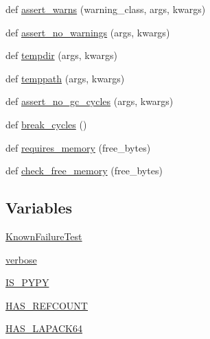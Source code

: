 \begin{DoxyCompactItemize}
def \hyperlink{namespacenumpy_1_1testing_1_1__private_1_1utils_a64b071c82e9ecb8aad0515f7ba217e9d}{assert\+\_\+warns} (warning\+\_\+class, args, kwargs)
\item 
def \hyperlink{namespacenumpy_1_1testing_1_1__private_1_1utils_a3f23e39a989fc996a88d58fa2ce03134}{assert\+\_\+no\+\_\+warnings} (args, kwargs)
\item 
def \hyperlink{namespacenumpy_1_1testing_1_1__private_1_1utils_a05901223fea3a962d09904ced2cbbabd}{tempdir} (args, kwargs)
\item 
def \hyperlink{namespacenumpy_1_1testing_1_1__private_1_1utils_ab53b48d1f4f2593e39d1fe9be00b3cc8}{temppath} (args, kwargs)
\item 
def \hyperlink{namespacenumpy_1_1testing_1_1__private_1_1utils_aeb0834f11062ae32be7e366a8601278f}{assert\+\_\+no\+\_\+gc\+\_\+cycles} (args, kwargs)
\item 
def \hyperlink{namespacenumpy_1_1testing_1_1__private_1_1utils_acffb1a5389e1d7e84e257af6b81590ff}{break\+\_\+cycles} ()
\item 
def \hyperlink{namespacenumpy_1_1testing_1_1__private_1_1utils_a7893225a239144d72d56ad9a90a77aeb}{requires\+\_\+memory} (free\+\_\+bytes)
\item 
def \hyperlink{namespacenumpy_1_1testing_1_1__private_1_1utils_a5ee52c7dc93bdc4ac9cbc2c0460197d9}{check\+\_\+free\+\_\+memory} (free\+\_\+bytes)
\end{DoxyCompactItemize}
\subsection*{Variables}
\begin{DoxyCompactItemize}
\item 
\hyperlink{namespacenumpy_1_1testing_1_1__private_1_1utils_ae212763dc9bbd2fb87944cc9b09d5325}{Known\+Failure\+Test}
\item 
\hyperlink{namespacenumpy_1_1testing_1_1__private_1_1utils_a4c0b8d13ca08494290635e712a0e8715}{verbose}
\item 
\hyperlink{namespacenumpy_1_1testing_1_1__private_1_1utils_afebfc112ebc827f388243acab11e42bc}{I\+S\+\_\+\+P\+Y\+PY}
\item 
\hyperlink{namespacenumpy_1_1testing_1_1__private_1_1utils_a796c1e504358d9515dbb96695bbde581}{H\+A\+S\+\_\+\+R\+E\+F\+C\+O\+U\+NT}
\item 
\hyperlink{namespacenumpy_1_1testing_1_1__private_1_1utils_aa751740baa9c3ecdb67319506a3002bd}{H\+A\+S\+\_\+\+L\+A\+P\+A\+C\+K64}
\end{DoxyCompactItemize}


